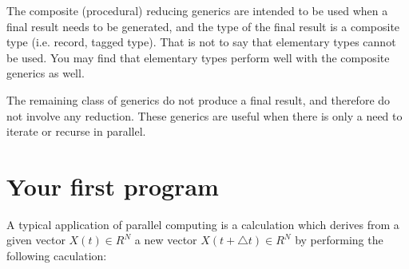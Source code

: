 \documentclass[justified]{tufte-book}
\numberwithin{equation}{subsection}
\begin{document}
The composite (procedural) reducing generics are intended to be used
when a final result needs to be generated, and the type of the final
result is a composite type (i.e. record, tagged type).
That is not to say that elementary types cannot be used. You may find
that elementary types perform well with the composite generics as well.

The remaining class of generics do not produce a final result, and
therefore do not involve any reduction. These generics are useful when
there is only a need to iterate or recurse in parallel.

\chapter{Your first program}

A typical application of parallel computing is a calculation which derives
from a given vector \begin{math} X(t) \in R^N \end{math} a new vector 
\begin{math} X(t+\bigtriangleup t) \in R^N\end{math} by performing the following 
caculation:
\end{document}
